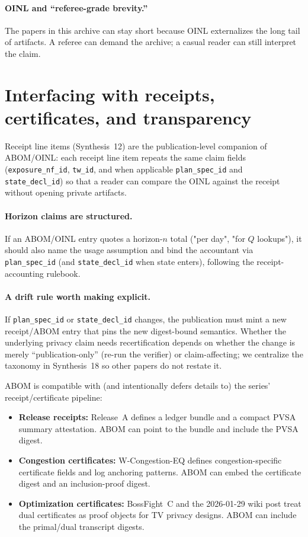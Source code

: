 \documentclass[11pt]{article}
\begin{document}
\paragraph{OINL and ``referee-grade brevity.''}
The papers in this archive can stay short because OINL externalizes the long tail of artifacts.
A referee can demand the archive; a casual reader can still interpret the claim.

\section{Interfacing with receipts, certificates, and transparency}

Receipt line items (Synthesis~12) are the publication-level companion of ABOM/OINL: each receipt line item repeats the same claim fields (\texttt{exposure\_nf\_id}, \texttt{tw\_id}, and when applicable \texttt{plan\_spec\_id} and \texttt{state\_decl\_id}) so that a reader can compare the OINL against the receipt without opening private artifacts.\cite{series:receiptitems}

\paragraph{Horizon claims are structured.}
If an ABOM/OINL entry quotes a horizon-$n$ total ("per day", "for $Q$ lookups"), it should also name the usage assumption and bind the accountant via \texttt{plan\_spec\_id} (and \texttt{state\_decl\_id} when state enters), following the receipt-accounting rulebook.\cite{series:accountingrulebook}


\paragraph{A drift rule worth making explicit.}
If \texttt{plan\_spec\_id} or \texttt{state\_decl\_id} changes, the publication must mint a new receipt/ABOM entry that pins the new digest-bound semantics.
Whether the underlying privacy claim needs recertification depends on whether the change is merely ``publication-only'' (re-run the verifier) or claim-affecting; we centralize the taxonomy in Synthesis~18 so other papers do not restate it.\cite{series:planstateequiv}

ABOM is compatible with (and intentionally defers details to) the series' receipt/certificate pipeline:
\begin{itemize}[leftmargin=*]
\item \textbf{Release receipts:} Release~A defines a ledger bundle and a compact PVSA summary attestation.\cite{series:releaseproperty}
ABOM can point to the bundle and include the PVSA digest.
\item \textbf{Congestion certificates:} W-Congestion-EQ defines congestion-specific certificate fields and log anchoring patterns.\cite{series:wcongeq}
ABOM can embed the certificate digest and an inclusion-proof digest.
\item \textbf{Optimization certificates:} BossFight~C and the 2026-01-29 wiki post treat dual certificates as proof objects for TV privacy designs.
ABOM can include the primal/dual transcript digests.
\end{itemize}
\end{document}
